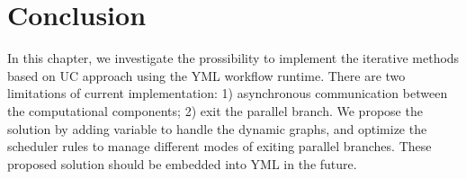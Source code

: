 \section{Conclusion}

In this chapter, we investigate the prossibility to implement the iterative methods based on UC approach using the YML workflow runtime. There are two limitations of current implementation: 1) asynchronous communication between the computational components; 2) exit the parallel branch. We propose the solution by adding variable to handle the dynamic graphs, and optimize the scheduler rules to manage different modes of exiting parallel branches. These proposed solution should be embedded into YML in the future.


\clearemptydoublepage

\clearemptydoublepage